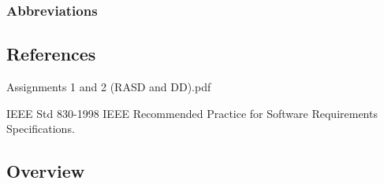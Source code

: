\subsubsection{Abbreviations}


\subsection{References}
\begingroup
\renewcommand{\section}[2]{}%
\begin{thebibliography}{9}
Assignments 1 and 2 (RASD and DD).pdf

IEEE Std 830-1998 IEEE Recommended Practice for Software Requirements
Specifications.
\end{thebibliography}
\endgroup

\subsection{Overview}
